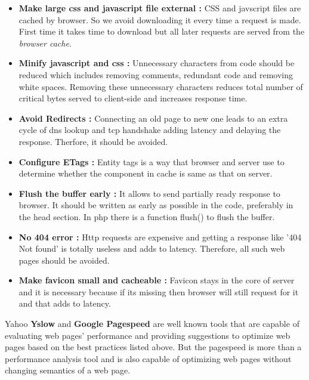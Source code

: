 \documentclass[conference]{IEEEtran}
\begin{document}
\begin{itemize}
\item \textbf{Make large css and javascript file external :}
CSS and javscript files are cached by browser. So we avoid downloading it every time a request is made.
First time it takes time to download but all later requests are served from the {\it browser cache}.

\item \textbf{ Minify javascript and css :}
Unnecessary characters from code should be reduced which includes removing
comments, redundant code and removing white spaces. Removing these unnecessary
characters reduces total number of critical bytes served to client-side and increases response time.

\item \textbf{Avoid Redirects :}
Connecting an old page to new one leads to an extra cycle of dns lookup and tcp handshake adding latency
and delaying the response. Therfore, it should be avoided.

\item \textbf{Configure ETags :}
Entity tags is a way that browser and server use to determine whether the
component in cache is same as that on server.

\item \textbf{Flush the buffer early :}
It allows to send partially ready response to browser. It should be written as
early as possible in the code, preferably in the head section.
In php there is a function flush() to flush the buffer. 

\item \textbf{No 404 error :}
Http requests are expensive and getting a response like '404 Not found' is totally useless
and adds to latency. Therefore, all such web pages should be avoided.

\item \textbf{Make favicon small and cacheable :}
Favicon stays in the core of server and  it is necessary because if its missing then
browser will still request for it and that adds to latency.
\end{itemize}

Yahoo {\bf Yslow}\cite{yslow} and {\bf Google Pagespeed}\cite{gps} are well known tools that are capable of
evaluating web pages' performance and providing suggestions to optimize web pages
based on the best practices listed above. But the pagespeed is more than a performance analysis
tool and is also capable of optimizing web pages without changing semantics of a web page.
\end{document}

